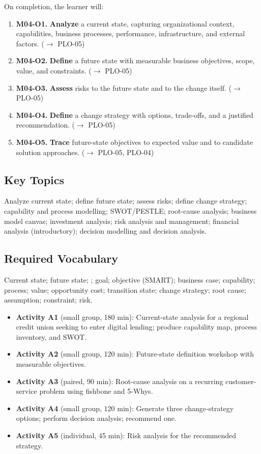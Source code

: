 \documentclass[11pt,letterpaper,oneside]{report}
\begin{document}
\begin{outcomes}
On completion, the learner will:
\begin{enumerate}
  \item \textbf{M04-O1.} \textbf{Analyze} a current state, capturing organizational context, capabilities, business processes, performance, infrastructure, and external factors. ($\to$ PLO-05)
  \item \textbf{M04-O2.} \textbf{Define} a future state with measurable business objectives, scope, value, and constraints. ($\to$ PLO-05)
  \item \textbf{M04-O3.} \textbf{Assess} risks to the future state and to the change itself. ($\to$ PLO-05)
  \item \textbf{M04-O4.} \textbf{Define} a change strategy with options, trade-offs, and a justified recommendation. ($\to$ PLO-05)
  \item \textbf{M04-O5.} \textbf{Trace} future-state objectives to expected value and to candidate solution approaches. ($\to$ PLO-05, PLO-04)
\end{enumerate}
\end{outcomes}

\subsection*{Key Topics}
Analyze current state; define future state; assess risks; define change strategy; capability and process modelling; SWOT/PESTLE; root-cause analysis; business model canvas; investment analysis; risk analysis and management; financial analysis (introductory); decision modelling and decision analysis.

\subsection*{Required Vocabulary}
Current state; future state; ; goal; objective (SMART); business case; capability; process; value; opportunity cost; transition state; change strategy; root cause; assumption; constraint; risk.

\begin{labbox}
\begin{itemize}
  \item \textbf{Activity A1} (small group, 180 min): Current-state analysis for a regional credit union seeking to enter digital lending; produce capability map, process inventory, and SWOT.
  \item \textbf{Activity A2} (small group, 120 min): Future-state definition workshop with measurable objectives.
  \item \textbf{Activity A3} (paired, 90 min): Root-cause analysis on a recurring customer-service problem using fishbone and 5-Whys.
  \item \textbf{Activity A4} (small group, 120 min): Generate three change-strategy options; perform decision analysis; recommend one.
  \item \textbf{Activity A5} (individual, 45 min): Risk analysis for the recommended strategy.
\end{itemize}
\end{labbox}
\end{document}

